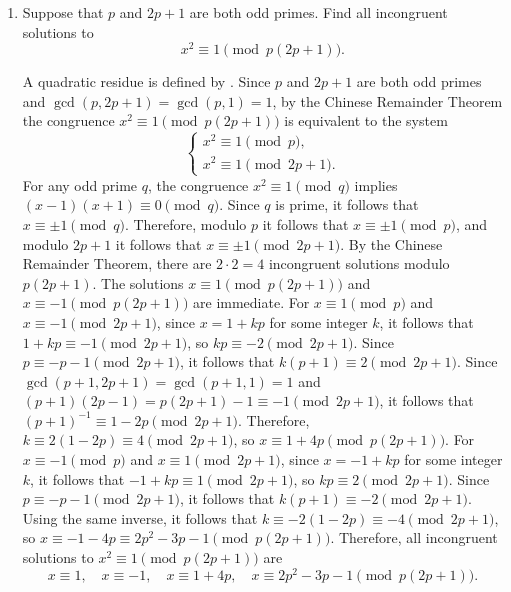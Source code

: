 \begin{enumerate}
  \item Suppose that $p$ and $2 p+1$ are both odd primes. Find all incongruent solutions to
  \[
  x^{2} \equiv 1 \pmod{p(2 p+1)}.
  \]
  \begin{subanswer}
    A quadratic residue is defined by . 
    Since $p$ and $2p+1$ are both odd primes and $\gcd(p, 2p+1) = \gcd(p, 1) = 1$, by the Chinese Remainder Theorem the congruence $x^2 \equiv 1 \pmod{p(2p+1)}$ is equivalent to the system
    \[
    \begin{cases}
    x^2 \equiv 1 \pmod{p},\\
    x^2 \equiv 1 \pmod{2p+1}.
    \end{cases}
    \]
    For any odd prime $q$, the congruence $x^2 \equiv 1 \pmod{q}$ implies $(x-1)(x+1) \equiv 0 \pmod{q}$.
    Since $q$ is prime, it follows that $x \equiv \pm 1 \pmod{q}$.
    Therefore, modulo $p$ it follows that $x \equiv \pm 1 \pmod{p}$, and modulo $2p+1$ it follows that $x \equiv \pm 1 \pmod{2p+1}$.
    By the Chinese Remainder Theorem, there are $2 \cdot 2 = 4$ incongruent solutions modulo $p(2p+1)$.
    The solutions $x \equiv 1 \pmod{p(2p+1)}$ and $x \equiv -1 \pmod{p(2p+1)}$ are immediate.
    For $x \equiv 1 \pmod{p}$ and $x \equiv -1 \pmod{2p+1}$, since $x = 1 + kp$ for some integer $k$, it follows that $1 + kp \equiv -1 \pmod{2p+1}$, so $kp \equiv -2 \pmod{2p+1}$.
    Since $p \equiv -p-1 \pmod{2p+1}$, it follows that $k(p+1) \equiv 2 \pmod{2p+1}$.
    Since $\gcd(p+1, 2p+1) = \gcd(p+1, 1) = 1$ and $(p+1)(2p-1) = p(2p+1) - 1 \equiv -1 \pmod{2p+1}$, it follows that $(p+1)^{-1} \equiv 1-2p \pmod{2p+1}$.
    Therefore, $k \equiv 2(1-2p) \equiv 4 \pmod{2p+1}$, so $x \equiv 1 + 4p \pmod{p(2p+1)}$.
    For $x \equiv -1 \pmod{p}$ and $x \equiv 1 \pmod{2p+1}$, since $x = -1 + kp$ for some integer $k$, it follows that $-1 + kp \equiv 1 \pmod{2p+1}$, so $kp \equiv 2 \pmod{2p+1}$.
    Since $p \equiv -p-1 \pmod{2p+1}$, it follows that $k(p+1) \equiv -2 \pmod{2p+1}$.
    Using the same inverse, it follows that $k \equiv -2(1-2p) \equiv -4 \pmod{2p+1}$, so $x \equiv -1 - 4p \equiv 2p^2 - 3p - 1 \pmod{p(2p+1)}$.
    Therefore, all incongruent solutions to $x^2 \equiv 1 \pmod{p(2p+1)}$ are
    \[
    x \equiv 1, \quad x \equiv -1, \quad x \equiv 1 + 4p, \quad x \equiv 2p^2 - 3p - 1 \pmod{p(2p+1)}.
    \]
  \end{subanswer}









\end{enumerate}
